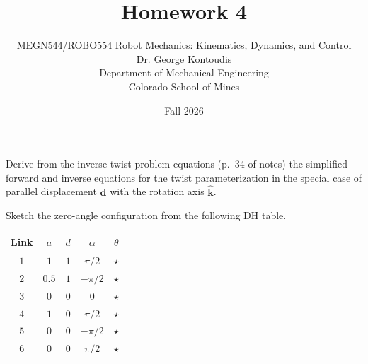 \documentclass[12pt]{article}
\newenvironment{problem}[2][Problem]{\begin{trivlist}
\item[\hskip \labelsep {\bfseries #1}\hskip \labelsep {\bfseries #2.}]}{\end{trivlist}}
\begin{document}
 
 
\title{Homework 4}
\author{MEGN544/ROBO554 Robot Mechanics: Kinematics, Dynamics, and Control  
\\ 
Dr. George Kontoudis\\
Department of Mechanical Engineering\\
Colorado School of Mines}
\date{Fall 2026}
 
\maketitle
\begin{problem}{1}%
Derive from the inverse twist problem equations (p.~34 of notes) the
simplified forward and inverse equations for the twist parameterization in the
special case of parallel displacement $\boldsymbol{d}$ with the rotation axis $\widehat{\boldsymbol{k}}$.
 
\end{problem}

\begin{problem}{2}\label{p2}%
Sketch the zero-angle configuration from the following DH table.

\begin{table}[!h]
\centering
\begin{tabular}{c | c | c | c | c}
\hline 
 {Link} & $a$ & $d$ & $\alpha$ & $\theta$\\  \hline
 $1$ & $1$ & $1$ & $\pi/2$ & $\star$ \\ 
 $2$ & $0.5$ & $1$ & $-\pi/2$ & $\star$ \\ 
 $3$ & $0$ & $0$ & $0$ & $\star$ \\ 
 $4$ & $1$ & $0$ & $\pi/2$ & $\star$ \\ 
 $5$ & $0$ & $0$ & $-\pi/2$ & $\star$ \\ 
 $6$ & $0$ & $0$ & $\pi/2$ & $\star$ \\ \hline
\end{tabular}\label{tab:part_1_ii}
\end{table}
 
\end{problem}
\end{document}
